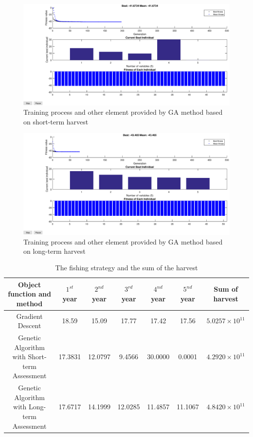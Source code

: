 \documentclass{IEEEtran}
\begin{document}
\begin{figure}[h]
    \includegraphics[width=\columnwidth]{1GA.eps}
    \caption{Training process and other element provided by GA method based on short-term harvest}
    \label{fig1}
\end{figure}
\begin{figure}[h]
    \includegraphics[width=\columnwidth]{2GA.eps}
    \caption{Training process and other element provided by GA method based on long-term harvest}
    \label{fig2}
\end{figure}

\begin{table}
    \normalsize
    \caption{The fishing strategy and the sum of the harvest}
    \label{tab1}
    \begin{tabular}{ccccccc}\toprule
        Object function and method & $1^{st}$ year & $2^{nd}$ year & $3^{rd}$ year & $4^{nd}$ year & $5^{nd}$ year & Sum of harvest \\ 
        \midrule
        Gradient Descent & 18.59 & 15.09 & 17.77 & 17.42 & 17.56 & $5.0257\times10^{11}$\\
        Genetic Algorithm with Short-term Assessment & 17.3831 & 12.0797 & 9.4566 & 30.0000 & 0.0001 & $4.2920\times10^{11}$\\ 
        Genetic Algorithm with Long-term Assessment & 17.6717 & 14.1999 & 12.0285 & 11.4857 & 11.1067 & $4.8420\times10^{11}$\\
        \bottomrule
    \end{tabular} 
\end{table}
\end{document}
